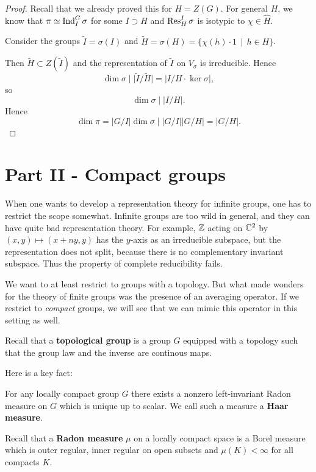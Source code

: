 \documentclass[11pt, english]{article}
\begin{document}
\begin{proof}
Recall that we already proved this for $H=Z(G)$. For general $H$, we know that $\pi \simeq \operatorname{Ind}_I^G \sigma$ for some  $I \supset H$ and $\operatorname{Res}_H^I \sigma$ is isotypic to $\chi \in \widehat H$. 

Consider the groups $\widetilde I = \sigma(I)$ and $\widetilde H = \sigma(H) = \{\chi(h) \cdot 1 \, \mid \, h \in H \}$. 

Then $\widetilde H \subset Z(\widetilde I)$ and the representation of $\widetilde I$ on $V_\sigma$ is irreducible. Hence 
$$
\dim \sigma \mid \lvert \widetilde I / \widetilde H \rvert = \lvert I  / H \cdot \ker \sigma \rvert,
$$
so
$$
\dim \sigma \mid \lvert I / H \rvert.
$$
Hence 
$$
\dim \pi = \lvert G / I \rvert \dim \sigma  \mid \lvert G / I \rvert \lvert G / H \rvert = \lvert  G /H \rvert.
$$
\end{proof}


\newpage
\section{Part II - Compact groups}

When one wants to develop a representation theory for infinite groups, one has to restrict the scope somewhat. Infinite groups are too wild in general, and they can have quite bad representation theory. For example, $\mathbb{Z}$ acting on $\mathbb{C}^2$ by $(x,y) \mapsto (x+ny,y)$ has the $y$-axis as an irreducible subspace, but the representation does not split, because there is no complementary invariant subspace. Thus the property of complete reducibility fails. 

We want to at least restrict to groups with a topology. But what made wonders for the theory of finite groups was the presence of an averaging operator. If we restrict to \emph{compact} groups, we will see that we can mimic this operator in this setting as well.

Recall that a \textbf{topological group} is a group $G$ equipped with a topology such that the group law and the inverse are continous maps. 

Here is a key fact:
\begin{prop}
For any locally compact group $G$ there exists a nonzero left-invariant Radon measure on $G$ which is unique up to scalar. We call such a measure a \textbf{Haar measure}.  
\end{prop}

Recall that a \textbf{Radon measure} $\mu$ on a locally compact space is a Borel measure which is outer regular, inner regular on open subsets and $\mu(K) < \infty$ for all compacts $K$.
\end{document}
